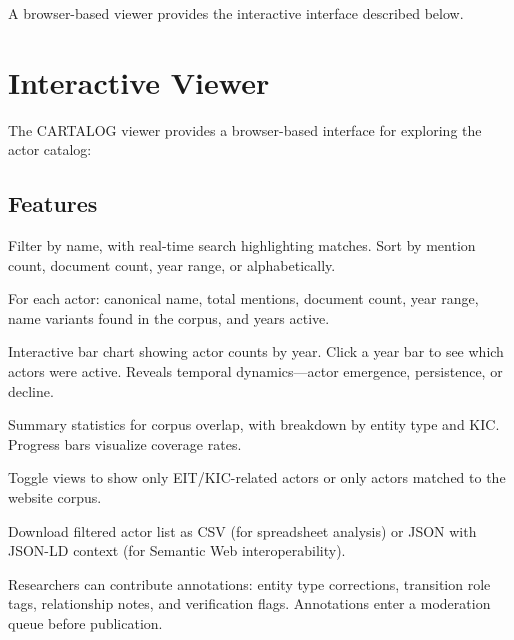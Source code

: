 \documentclass[../main.tex]{subfiles}
\begin{document}
A browser-based viewer provides the interactive interface described below.


\section{Interactive Viewer}

The \textsc{CARTALOG} viewer provides a browser-based interface for exploring the actor catalog:

\subsection{Features}

\begin{description}[leftmargin=0.5cm, itemsep=0.3em]

\item[Searchable Actor List] Filter by name, with real-time search highlighting matches. Sort by mention count, document count, year range, or alphabetically.

\item[Actor Detail View] For each actor: canonical name, total mentions, document count, year range, name variants found in the corpus, and years active.

\item[Timeline Visualization] Interactive bar chart showing actor counts by year. Click a year bar to see which actors were active. Reveals temporal dynamics---actor emergence, persistence, or decline.

\item[Cross-Validation Panel] Summary statistics for corpus overlap, with breakdown by entity type and KIC. Progress bars visualize coverage rates.

\item[Filter Options] Toggle views to show only EIT/KIC-related actors or only actors matched to the website corpus.

\item[Export Functionality] Download filtered actor list as CSV (for spreadsheet analysis) or JSON with JSON-LD context (for Semantic Web interoperability).

\item[Annotation Interface] Researchers can contribute annotations: entity type corrections, transition role tags, relationship notes, and verification flags. Annotations enter a moderation queue before publication.

\end{description}
\end{document}
